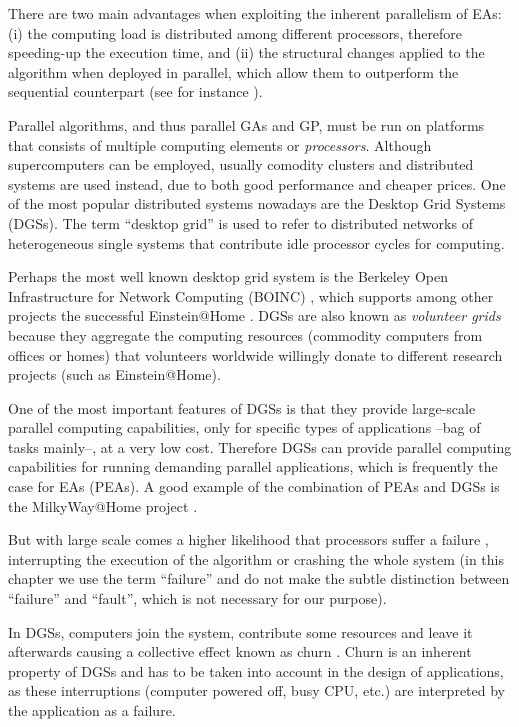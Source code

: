 \documentclass[graybox]{sty/svmult}
\begin{document}
There are two main advantages when exploiting the inherent parallelism of EAs: (i) the computing load is distributed among different processors, therefore speeding-up the
execution time, and (ii) the structural changes applied to the algorithm when deployed in parallel, which allow them to outperform the sequential counterpart 
(see for instance \cite{spatially-structured-EAs}).

Parallel algorithms, and thus parallel GAs and GP, must be run on platforms that consists of multiple computing elements or \emph{processors}. Although supercomputers can be employed, usually comodity clusters and distributed systems are used instead, due to both good performance and cheaper prices.  One of the most popular distributed systems nowadays are the  Desktop Grid Systems (DGSs). 
The term ``desktop grid'' is used to refer to distributed networks of
heterogeneous single systems that contribute idle processor cycles for computing. 

Perhaps the most well known desktop grid system is the Berkeley Open Infrastructure for Network Computing (BOINC) \cite{boinc-paper}, 
which supports among other projects the successful Einstein@Home \cite{einsteinathome-2} . DGSs are also known as \emph{volunteer grids} because they
aggregate the computing resources (commodity computers from offices or homes) that volunteers worldwide willingly donate to different research 
projects (such as Einstein@Home). 

One of the most important features of DGSs is that they provide large-scale parallel computing capabilities, only for specific
types of applications --bag of tasks mainly--, at a very low cost. Therefore DGSs can provide parallel computing capabilities for running demanding parallel applications, which is frequently the case for EAs (PEAs).  A good example of the combination of PEAs and DGSs is the MilkyWay@Home project \cite{milkywayathome}. 


But with large scale comes a higher 
likelihood that processors suffer a failure \cite{largescale_failures}, interrupting the execution of the algorithm or crashing the whole system (in this 
chapter we use the term ``failure'' and do not make the subtle distinction between ``failure'' and ``fault'', which
is not necessary for our purpose).

In DGSs, computers join the system, contribute some resources 
and leave it afterwards causing a collective effect known as churn \cite{Stutzbach06Understanding}.
Churn is an inherent property of DGSs and has to be taken into 
account in the design of applications, as these interruptions (computer powered off, busy CPU, etc.) are interpreted by the application as a failure.   
\end{document}

